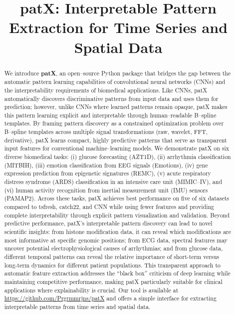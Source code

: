 \documentclass[11pt]{article}
\title{patX: Interpretable Pattern Extraction for Time Series and Spatial Data}
\begin{document}
\maketitle

\begin{abstract}
We introduce \textbf{patX}, an open--source Python package that bridges the gap
between the automatic pattern learning capabilities of convolutional neural
networks (CNNs) and the interpretability requirements of biomedical applications.
Like CNNs, patX automatically discovers discriminative patterns from input data
and uses them for prediction; however, unlike CNNs where learned patterns remain
opaque, patX makes this pattern learning explicit and interpretable through
human--readable B--spline templates.
By framing pattern discovery as a constrained optimization problem over
B--spline templates across multiple signal transformations (raw, wavelet, FFT,
derivative), patX learns compact, highly predictive patterns that serve as
transparent input features for conventional machine--learning models.
We demonstrate patX on six diverse biomedical tasks: (i) glucose forecasting
(AZT1D), (ii) arrhythmia classification (MITBIH), (iii) emotion classification
from EEG signals (Emotions), (iv) gene expression prediction from epigenetic
signatures (REMC), (v) acute respiratory distress syndrome (ARDS)
classification in an intensive care unit (MIMIC--IV), and (vi) human activity
recognition from inertial measurement unit (IMU) sensors (PAMAP2).
Across these tasks, patX achieves best performance on five of six datasets
compared to tsfresh, catch22, and CNN while using fewer features and
providing complete interpretability through explicit pattern visualization and
validation.
Beyond predictive performance, patX's interpretable pattern discovery can lead
to novel scientific insights: from histone modification data, it can reveal
which modifications are most informative at specific genomic positions; from
ECG data, spectral features may uncover potential electrophysiological causes
of arrhythmias; and from glucose data, different temporal patterns can reveal
the relative importance of short-term versus long-term dynamics for different
patient populations.
This transparent approach to automatic feature extraction addresses the
``black box'' criticism of deep learning while maintaining competitive
performance, making patX particularly suitable for clinical applications where
explainability is crucial.
Our tool is available at \url{https://github.com/Prgrmmrjns/patX} and offers a
simple interface for extracting interpretable patterns from time series and
spatial data.
\end{abstract}
\end{document}
